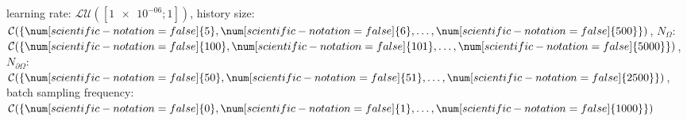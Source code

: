 learning rate: $\mathcal{LU}([\num[scientific-notation=true]{1e-06}; \num[scientific-notation=false]{1}])$, history size: $\mathcal{C}(\{\num[scientific-notation=false]{5},\num[scientific-notation=false]{6},\text{\dots},\num[scientific-notation=false]{500}\})$, $N_{\Omega}$: $\mathcal{C}(\{\num[scientific-notation=false]{100},\num[scientific-notation=false]{101},\text{\dots},\num[scientific-notation=false]{5000}\})$, $N_{\partial\Omega}$: $\mathcal{C}(\{\num[scientific-notation=false]{50},\num[scientific-notation=false]{51},\text{\dots},\num[scientific-notation=false]{2500}\})$, batch sampling frequency: $\mathcal{C}(\{\num[scientific-notation=false]{0},\num[scientific-notation=false]{1},\text{\dots},\num[scientific-notation=false]{1000}\})$